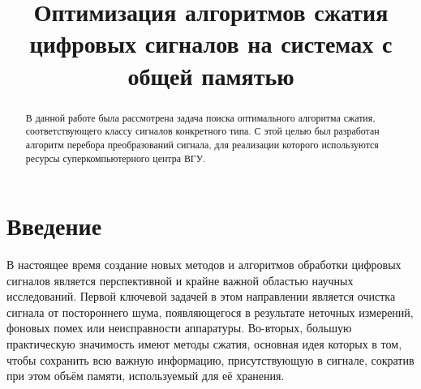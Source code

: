 \documentclass[11pt, oneside, a4paper]{article}
\begin{document}

\title{Оптимизация алгоритмов сжатия цифровых сигналов на системах с общей памятью}


\begin{abstract}
В данной работе была рассмотрена задача поиска оптимального алгоритма сжатия, соответствующего классу сигналов конкретного типа. С этой целью был разработан алгоритм перебора преобразований сигнала, для реализации которого используются ресурсы суперкомпьютерного центра ВГУ.
\end{abstract}



\section{Введение}

В настоящее время создание новых методов и алгоритмов обработки цифровых сигналов является перспективной и крайне важной областью научных исследований. Первой ключевой задачей в этом направлении является очистка сигнала от постороннего шума, появляющегося в результате неточных измерений, фоновых помех или неисправности аппаратуры. Во-вторых, большую практическую значимость имеют методы сжатия, основная идея которых в том, чтобы сохранить всю важную информацию, присутствующую в сигнале, сократив при этом объём памяти, используемый для её хранения.
\end{document}
